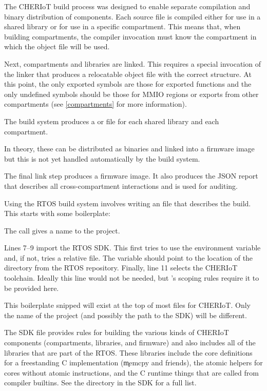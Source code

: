 The CHERIoT build process was designed to enable separate compilation and binary distribution of components.
Each source file is compiled either for use in a shared library or for use in a specific compartment.
This means that, when building compartments, the compiler invocation must know the compartment in which the object file will be used.

Next, compartments and libraries are linked.
This requires a special invocation of the linker that produces a relocatable object file with the correct structure.
At this point, the only exported symbols are those for exported functions and the only undefined symbols should be those for MMIO regions or exports from other compartments (see \ref{compartments} for more information).

\begin{note}
	The build system produces a  or  file for each shared library and each compartment.
\end{note}

In theory, these can be distributed as binaries and linked into a firmware image but this is not yet handled automatically by the build system.

The final link step produces a firmware image.
It also produces the JSON report that describes all cross-compartment interactions and is used for auditing.

Using the RTOS build system involves writing an  file that describes the build.
This starts with some boilerplate:

\lualisting[filename=examples/hello_world/xmake.lua,marker=boilerplate,label=lst:xmakeboilerplate,caption="Build system code for importing the CHERIoT RTOS SDK"]{}

The  call gives a name to the project.

Lines 7–9 import the RTOS SDK.
This first tries to use the  environment variable and, if not, tries a relative file.
The  variable should point to the location of the  directory from the RTOS repository.
Finally, line 11 selects the CHERIoT toolchain.
Ideally this line would not be needed, but 's scoping rules require it to be provided here.

This boilerplate snipped will exist at the top of most  files for CHERIoT.
Only the name of the project (and possibly the path to the SDK) will be different.

The SDK file provides rules for building the various kinds of CHERIoT components (compartments, libraries, and firmware) and also includes all of the libraries that are part of the RTOS.
These libraries include the core definitions for a freestanding C implementation (\c{memcpy} and friends), the atomic helpers for cores without atomic instructions, and the C runtime things that are called from compiler builtins.
See the  directory in the SDK for a full list.

